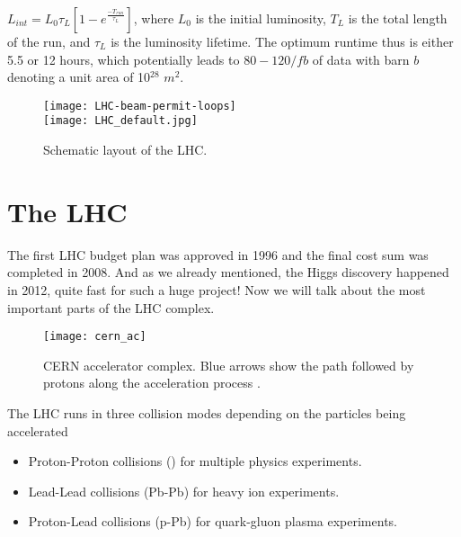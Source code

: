 $L_{int} = L_0 \tau_L \left[  1- e^{\frac{-T_{run}}{\tau_L}}  \right]$, 
where $L_0$ is the initial luminosity, $T_L$ is the total length of the run, and $\tau_L$ is the luminosity lifetime. The optimum runtime thus is either 5.5 or 12 hours, which potentially leads to $80-120/fb$ of data with barn $b$ denoting a unit area of 10$^{28}$ $m^2$. 


\begin{figure}[H]
  \centering
  \texttt{[image: LHC-beam-permit-loops]}\\
  \texttt{[image: LHC\_default.jpg]}
  \caption {Schematic layout of the LHC.}
  \label{lhcmap}
\end{figure}


\section{The LHC}\label{sec:lhc}
The first LHC budget plan was approved in 1996 and the final cost sum was completed in 2008. And as we already mentioned, the Higgs discovery happened in 2012, quite fast for such a huge project! Now we will talk about the most important parts of the LHC complex. 








 	 


\begin{figure}[!h]
  \centering
  \texttt{[image: cern\_ac]}
  \caption[CERN accelerator complex]{CERN accelerator complex. Blue arrows show the path followed by protons along the acceleration process \cite{cern}.}\label{fig:cern}
\end{figure}

The LHC runs in three collision modes depending on the particles being accelerated

\begin{itemize}
\item Proton-Proton collisions (\pp) for multiple physics experiments.
\item Lead-Lead collisions (Pb-Pb) for heavy ion experiments. 
\item Proton-Lead collisions (p-Pb) for quark-gluon plasma experiments.
\end{itemize}

